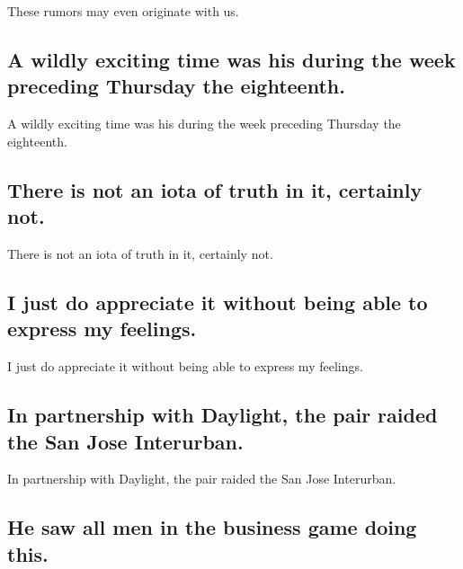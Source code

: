 \documentclass[]{article}
\begin{document}
These rumors may even originate with us.

\hypertarget{a-wildly-exciting-time-was-his-during-the-week-preceding-thursday-the-eighteenth.}{%
\subsection{A wildly exciting time was his during the week preceding
Thursday the
eighteenth.}\label{a-wildly-exciting-time-was-his-during-the-week-preceding-thursday-the-eighteenth.}}

A wildly exciting time was his during the week preceding Thursday the
eighteenth.

\hypertarget{there-is-not-an-iota-of-truth-in-it-certainly-not.}{%
\subsection{There is not an iota of truth in it, certainly
not.}\label{there-is-not-an-iota-of-truth-in-it-certainly-not.}}

There is not an iota of truth in it, certainly not.

\hypertarget{i-just-do-appreciate-it-without-being-able-to-express-my-feelings.}{%
\subsection{I just do appreciate it without being able to express my
feelings.}\label{i-just-do-appreciate-it-without-being-able-to-express-my-feelings.}}

I just do appreciate it without being able to express my feelings.

\hypertarget{in-partnership-with-daylight-the-pair-raided-the-san-jose-interurban.}{%
\subsection{In partnership with Daylight, the pair raided the San Jose
Interurban.}\label{in-partnership-with-daylight-the-pair-raided-the-san-jose-interurban.}}

In partnership with Daylight, the pair raided the San Jose Interurban.

\hypertarget{he-saw-all-men-in-the-business-game-doing-this.}{%
\subsection{He saw all men in the business game doing
this.}\label{he-saw-all-men-in-the-business-game-doing-this.}}
\end{document}
